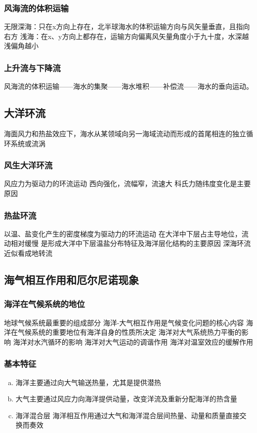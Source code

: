 	\subsubsection{风海流的体积运输}
	无限深海：只在x方向上存在，北半球海水的体积运输方向与风矢量垂直，且指向右方
	浅海：在x、y方向上都存在，运输方向偏离风矢量角度小于九十度，水深越浅偏角越小
	\subsubsection{上升流与下降流}
	风海流的体积运输——海水的集聚——海水堆积——补偿流——海水的垂向运动。
\subsection{大洋环流}
海面风力和热盐效应下，海水从某领域向另一海域流动而形成的首尾相连的独立循环系统或流涡
	\subsubsection{风生大洋环流}
	风应力为驱动力的环流运动
	西向强化，流幅窄，流速大
	科氏力随纬度变化是主要原因
	\subsubsection{热盐环流}
	以温、盐变化产生的密度梯度为驱动力的环流运动
	在大洋中下层占主导地位，流动相对缓慢
	是形成大洋中下层温盐分布特征及海洋层化结构的主要原因
	深海环流近似看成地转流
	
\subsection{海气相互作用和厄尔尼诺现象}
	\subsubsection{海洋在气候系统的地位}
	地球气候系统最重要的组成部分
	海洋-大气相互作用是气候变化问题的核心内容
	海洋在气候系统的重要地位有海洋自身的性质所决定
	海洋对大气系统热力平衡的影响
	海洋对水汽循环的影响
	海洋对大气运动的调谐作用
	海洋对温室效应的缓解作用
	
	\subsubsection{基本特征}
	\begin{enumerate}[a)]
		\item 海洋主要通过向大气输送热量，尤其是提供潜热
		\item 大气主要通过风应力向海洋提供动量，改变洋流及重新分配海洋的热含量
		\item 海洋混合层 海洋相互作用通过大气和海洋混合层间热量、动量和质量直接交换而奏效
	\end{enumerate}
	
